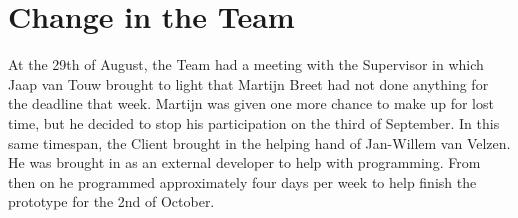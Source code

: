 \section{Change in the Team}
\thispagestyle{fancy}
\label{sec:teamchange}
At the 29th of August, the Team had a meeting with the Supervisor in which Jaap van Touw brought to light that Martijn Breet had not done anything for the deadline that week. Martijn was given one more chance to make up for lost time, but he decided to stop his participation on the third of September. In this same timespan, the Client brought in the helping hand of Jan-Willem van Velzen. He was brought in as an external developer to help with programming. From then on he programmed approximately four days per week to help finish the prototype for the 2nd of October. 
